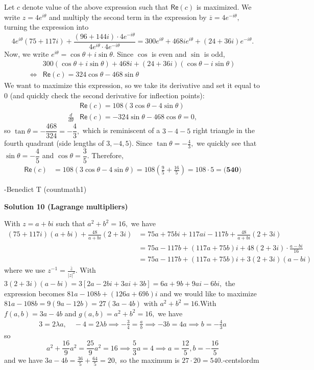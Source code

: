 \begin{enumerate}
Let $c$ denote value of the above expression such that $\mathsf{Re} (c)$ is maximized. We write $z=4e^{i\theta}$ and multiply the second term in the expression by $\overline{z} = 4e^{-i\theta},$ turning the expression into
 \[4e^{i\theta}(75+117i) + \frac{(96 + 144i)\cdot 4e^{-i\theta}}{4e^{i\theta}\cdot 4e^{-i\theta}} = 300e^{i\theta} + 468ie^{i\theta} + (24+ 36i)e^{-i\theta}.\]Now, we write $e^{i\theta} = \cos\theta + i\sin\theta$. Since $\cos$ is even and $\sin$ is odd,
 \begin{align*} &300(\cos\theta + i\sin\theta) +468i + (24+36i)(\cos\theta -i\sin\theta) \\ \iff & \mathsf{Re}(c) = 324\cos\theta -468\sin\theta \end{align*}
We want to maximize this expression, so we take its derivative and set it equal to $0$ (and quickly check the second derivative for inflection points):
 \begin{align*}     &\mathsf{Re}(c) = 108\left(3\cos\theta - 4\sin\theta\right)\\     \frac{d}{d\theta} &\mathsf{Re}(c) = -324\sin\theta -468\cos\theta = 0, \end{align*}
so $\tan\theta = -\dfrac{468}{324} = -\dfrac{4}{3},$ which is reminiscent of a $3-4-5$ right triangle in the fourth quadrant (side lengths of $3, -4, 5$). Since $\tan\theta = -\frac{4}{3},$ we quickly see that $\sin\theta = -\dfrac{4}{5}$ and $\cos\theta = \dfrac{3}{5}.$ Therefore,
 \begin{align*}  \mathsf{Re}(c) &= 108\left(3\cos\theta - 4\sin\theta \right) =  108\left(\frac{9}{5} + \frac{16}{5} \right)  = 108\cdot 5 = \boxed{\textbf{(540)}} \end{align*}


 -Benedict T (countmath1)

 



\textbf{Solution 10 (Lagrange multipliers)}

With $z = a + bi$ such that $a^2 + b^2 = 16,$ we have 
 \begin{align*} (75 +117i)(a + bi) + \frac{48}{a + bi}  (2 + 3i) &= 75a + 75bi + 117ai - 117b + \frac{48}{a + bi}(2 + 3i) \\ &= 75a - 117b + (117a + 75b)i + 48 (2 + 3i) \cdot \frac{a - bi}{16} \\ &= 75a - 117b + (117a + 75b)i + 3 (2 + 3i)(a - bi) \end{align*}
where we use $z^{-1} = \frac{\bar z}{|z|^2}.$ With $3 (2 + 3i)(a - bi) = 3 [2a - 2bi + 3ai + 3b] = 6a +9b +9ai-6bi,$ the expression becomes $81a-108b+ (126a + 69b)i$ and we would like to maximize $81a - 108b = 9(9a - 12b) = 27(3a - 4b)$ with $a^2 + b^2 = 16.$With $f(a, b) = 3a - 4b$ and $g(a, b) = a^2 + b^2 = 16,$ we have 
 \begin{align*} 3 = 2\lambda a, \quad -4 = 2\lambda b \implies -\frac{3}{4} = \frac ab \implies -3b = 4a \implies b = -\frac 43 a\end{align*}
so 
 \[a^2 + \frac{16}{9}a^2 = \frac{25}{9}a^2 = 16 \implies \frac{5}{3}a = 4 \implies a = \frac {12}5, b = -\frac{16}{5}\]and we have $3a - 4b = \frac{36}{5} + \frac{64}{5} = 20,$ so the maximum is $27 \cdot 20 = \boxed{540}.$-centslordm


\end{enumerate}

